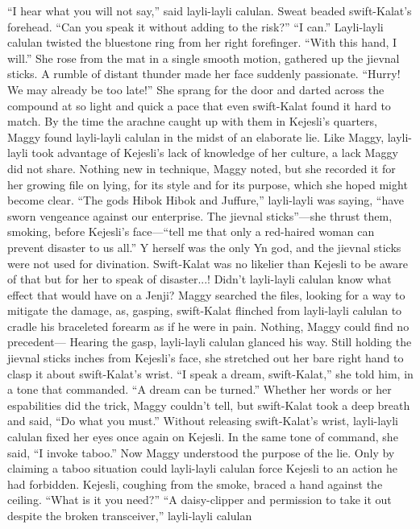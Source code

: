 \documentclass[9pt]{article}
\begin{document}
“I hear what you will not say,” said layli-layli calulan.
Sweat beaded swift-Kalat’s forehead. “Can you speak it without adding to the risk?”
“I can.” Layli-layli calulan twisted the bluestone ring from her right forefinger. “With this hand, I
will.” She rose from the mat in a single smooth motion, gathered up the jievnal sticks. A rumble of distant
thunder made her face suddenly passionate. “Hurry! We may already be too late!”
She sprang for the door and darted across the compound at so light and quick a pace that even
swift-Kalat found it hard to match.
By the time the arachne caught up with them in Kejesli’s quarters, Maggy found layli-layli calulan in
the midst of an elaborate lie. Like Maggy, layli-layli took advantage of Kejesli’s lack of knowledge of
her culture, a lack Maggy did not share.
Nothing new in technique, Maggy noted, but she recorded it for her growing file on lying, for its style
and for its purpose, which she hoped might become clear.
“The gods Hibok Hibok and Juffure,” layli-layli was saying, “have sworn vengeance against our
enterprise. The jievnal sticks”—she thrust them, smoking, before Kejesli’s face—“tell me that only a
red-haired woman can prevent disaster to us all.”
Y herself was the only Yn god, and the jievnal sticks were not used for divination. Swift-Kalat was
no likelier than Kejesli to be aware of that but for her to speak of disaster...! Didn’t layli-layli calulan
know what effect that would have on a Jenji? Maggy searched the files, looking for a way to mitigate the
damage, as, gasping, swift-Kalat flinched from layli-layli calulan to cradle his braceleted forearm as if
he were in pain. Nothing, Maggy could find no precedent—
Hearing the gasp, layli-layli calulan glanced his way. Still holding the jievnal sticks inches from
Kejesli’s face, she stretched out her bare right hand to clasp it about swift-Kalat’s wrist. “I speak a
dream, swift-Kalat,” she told him, in a tone that commanded. “A dream can be turned.”
Whether her words or her espabilities did the trick, Maggy couldn’t tell, but swift-Kalat took a deep
breath and said, “Do what you must.”
Without releasing swift-Kalat’s wrist, layli-layli calulan fixed her eyes once again on Kejesli. In the
same tone of command, she said, “I invoke taboo.”
Now Maggy understood the purpose of the lie. Only by claiming a taboo situation could layli-layli
calulan force Kejesli to an action he had forbidden.
Kejesli, coughing from the smoke, braced a hand against the ceiling. “What is it you need?”
“A daisy-clipper and permission to take it out despite the broken transceiver,” layli-layli calulan
\end{document}
